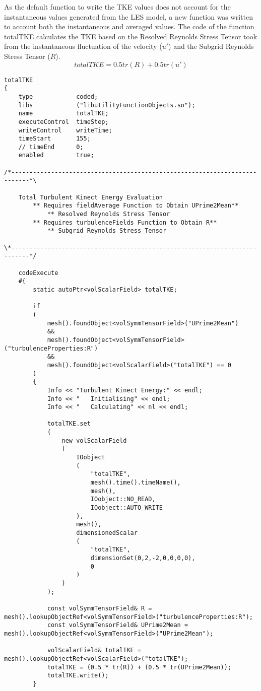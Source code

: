 \documentclass[../main.tex]{subfiles}
\begin{document}
As the default function to write the TKE values does not account for the instantaneous values generated from the LES model, a new function was written to account both the instantaneous and averaged values. The code of the function totalTKE calculates the TKE based on the Resolved Reynolds Stress Tensor took from the instantaneous fluctuation of the velocity ($u'$) and the Subgrid Reynolds Stress Tensor ($R$).
\begin{equation}
totalTKE= 0.5tr(R) + 0.5tr(u')
\end{equation}
\begin{lstlisting}
totalTKE
{
	type			coded;
	libs			("libutilityFunctionObjects.so");
	name			totalTKE;
	executeControl	timeStep;
	writeControl	writeTime;
	timeStart		155;
	// timeEnd		0;
	enabled			true;

/*---------------------------------------------------------------------------*\

	Total Turbulent Kinect Energy Evaluation
		** Requires fieldAverage Function to Obtain UPrime2Mean**
			** Resolved Reynolds Stress Tensor
		** Requires turbulenceFields Function to Obtain R**
			** Subgrid Reynolds Stress Tensor

\*---------------------------------------------------------------------------*/

	codeExecute
	#{
		static autoPtr<volScalarField> totalTKE;

		if
		(
			mesh().foundObject<volSymmTensorField>("UPrime2Mean")
			&&
			mesh().foundObject<volSymmTensorField>("turbulenceProperties:R")
			&&
			mesh().foundObject<volScalarField>("totalTKE") == 0
		)
		{
			Info << "Turbulent Kinect Energy:" << endl;
			Info << "	Initialising" << endl;
			Info << "	Calculating" << nl << endl;

			totalTKE.set
			(
				new volScalarField
				(
					IOobject
					(
						"totalTKE",
						mesh().time().timeName(),
						mesh(),
						IOobject::NO_READ,
						IOobject::AUTO_WRITE
					),
					mesh(),
					dimensionedScalar
					(
						"totalTKE",
						dimensionSet(0,2,-2,0,0,0,0),
						0
					)
				)
			);

			const volSymmTensorField& R = mesh().lookupObjectRef<volSymmTensorField>("turbulenceProperties:R");
			const volSymmTensorField& UPrime2Mean = mesh().lookupObjectRef<volSymmTensorField>("UPrime2Mean");

			volScalarField& totalTKE = mesh().lookupObjectRef<volScalarField>("totalTKE");
			totalTKE = (0.5 * tr(R)) + (0.5 * tr(UPrime2Mean));
			totalTKE.write();
		}


\end{lstlisting}
\end{document}
